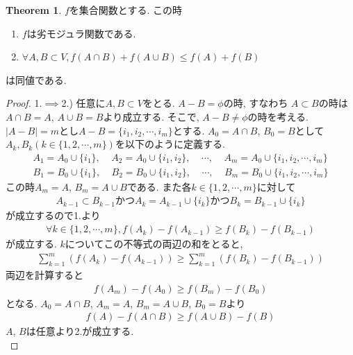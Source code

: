 \documentclass[11pt, a4paper, dvipdfmx]{jsarticle}
\theoremstyle{definition}
\newtheorem{Theorem+}[Axiom+]{Theorem}
\begin{document}
\begin{Theorem+}$f$を集合関数とする. この時
    \begin{enumerate}
        \item $f$は劣モジュラ関数である.
        \item $\forall A, B\subset V, f(A\cap B) + f(A\cup B)\leq f(A) + f(B)$ 
    \end{enumerate}
    は同値である.
    \begin{proof}
        1.$\implies$2.) 任意に$A, B\subset V$をとる. $A - B = \phi$の時, すなわち
        $A\subset B$の時は$A\cap B = A$, $A\cup B = B$より成立する. そこで, $A - B\neq\phi$の時を考える.
        $| A - B| = m$とし$A - B = \{i_{1}, i_{2}, \cdots, i_{m}\}$とする. $A_{0} = A\cap B$, $B_{0} = B$として
        $A_{k}, B_{k} (k\in\{1, 2, \cdots, m\})$を以下のように定義する.
        \begin{align*}
            A_{1} = A_{0}\cup\{i_{1}\}, ~~~~~ A_{2} = A_{0}\cup\{i_{1}, i_{2}\},~~~~~  \cdots, ~~~~~ A_{m} = A_{0}\cup\{i_{1}, i_{2}, \cdots, i_{m}\}\\
            B_{1} = B_{0}\cup\{i_{1}\}, ~~~~~ B_{2} = B_{0}\cup\{i_{1}, i_{2}\},~~~~~  \cdots, ~~~~~ B_{m} = B_{0}\cup\{i_{1}, i_{2}, \cdots, i_{m}\}
        \end{align*}
        この時$A_{m} = A$, $B_{m} = A\cup B$である. また各$k\in\{1, 2, \cdots, m\}$に対して
        \begin{align*}
             A_{k - 1}\subset B_{k-1}かつA_{k} = A_{k-1}\cup\{i_{k}\}かつB_{k} = B_{k-1}\cup\{i_{k}\}
        \end{align*}
        が成立するので1.より
        \begin{align*}
            \forall k\in\{1, 2, \cdots, m\}, f(A_{k}) - f(A_{k - 1})\geq f(B_{k}) - f(B_{k-1})
        \end{align*}
        が成立する. $k$についてこの不等式の両辺の和をとると, 
        \begin{align*}
            \sum_{k =1}^{m}\left(f(A_{k}) - f(A_{k - 1})\right)\geq\sum_{k =1}^{m}\left(f(B_{k}) - f(B_{k - 1})\right)
        \end{align*}
        両辺を計算すると
        \begin{align*}
            f(A_{m}) - f(A_{0})\geq f(B_{m}) - f(B_{0})
        \end{align*}
        となる. $A_{0} = A\cap B$, $A_{m} = A$, $B_{m} = A\cup B$, $B_{0} = B$より
        \begin{align*}
            f(A) - f(A\cap B)\geq f(A\cup B) - f(B)
        \end{align*}
        $A$, $B$は任意より2.が成立する.\\


\end{proof}
\end{Theorem+}
\end{document}
